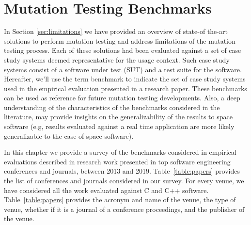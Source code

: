 
\chapter{Mutation Testing Benchmarks}
\label{chapter:industry}

In Section \ref{sec:limitations} we have provided an overview of state-of the-art solutions to perform mutation testing and address limitations of the mutation testing process.
Each of these solutions had been evaluated against a set of case study systems deemed representative for the usage context. Such case study systems consist of a software under test (SUT) and a test suite for the software.
Hereafter, we'll use the term benchmark to indicate the set of case study systems used in the empirical evaluation presented in a research paper.
These benchmarks can be used as reference for future mutation testing developments. 
Also, a deep understanding of the characteristics of the benchmarks considered in the literature, may provide insights on the generalizability of the results to space software (e.g, results evaluated against a real time application are more likely generalizable to the case of space software).




In this chapter we provide a survey of the benchmarks considered in empirical evaluations described in research work presented in top software engineering conferences and journals, between 2013 and 2019. Table~\ref{table:papers} provides the list of conferences and journals considered in our survey. For every venue, we have considered all the work evaluated against C and C++ software. Table~\ref{table:papers} provides the acronym and name of the venue, the type of venue, whether if it is a journal of a conference proceedings, and the publisher of the venue. 



